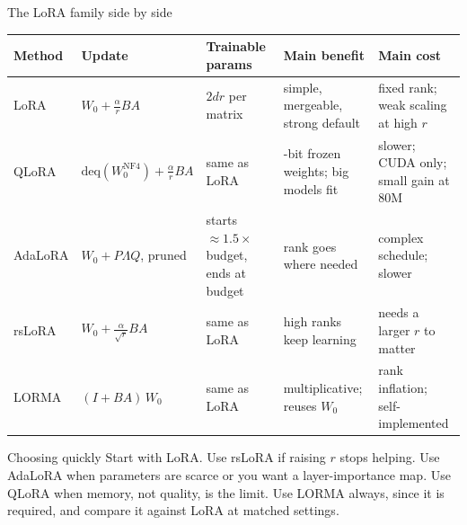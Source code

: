 \documentclass[aspectratio=169,11pt]{beamer}
\begin{document}
\begin{frame}{The LoRA family side by side}
  \footnotesize
  \begin{tabularx}{\textwidth}{@{}l>{\raggedright\arraybackslash}p{3.3cm}>{\raggedright\arraybackslash}X>{\raggedright\arraybackslash}X>{\raggedright\arraybackslash}X@{}}
    \toprule
    Method & Update & Trainable params & Main benefit & Main cost\\
    \midrule
    LoRA & $W_0+\frac{\alpha}{r}BA$ & $2dr$ per matrix & simple, mergeable, strong default & fixed rank; weak scaling at high $r$\\
    QLoRA & $\text{deq}(W_0^{\text{NF4}})+\frac{\alpha}{r}BA$ & same as LoRA & 4-bit frozen weights; big models fit & slower; CUDA only; small gain at 80M\\
    AdaLoRA & $W_0+P\Lambda Q$, pruned & starts $\approx1.5\times$ budget, ends at budget & rank goes where needed & complex schedule; slower\\
    rsLoRA & $W_0+\frac{\alpha}{\sqrt r}BA$ & same as LoRA & high ranks keep learning & needs a larger $r$ to matter\\
    LORMA & $(I+BA)\,W_0$ & same as LoRA & multiplicative; reuses $W_0$ & rank inflation; self-implemented\\
    \bottomrule
  \end{tabularx}
  \vspace{2mm}
  \begin{exampleblock}{Choosing quickly}
    \small
    Start with LoRA. Use rsLoRA if raising $r$ stops helping. Use AdaLoRA when parameters are scarce or you want a layer-importance map. Use QLoRA when memory, not quality, is the limit. Use LORMA always, since it is required, and compare it against LoRA at matched settings.
  \end{exampleblock}
\end{frame}
\end{document}
